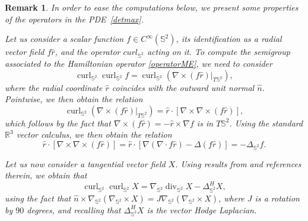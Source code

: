 \documentclass[11pt]{amsart}
\newtheorem{remark}[theorem]{Remark}
\newcommand{\R}{{\mathbb R}}
\newcommand{\IS}{\mathbb{S}}
\newcommand{\Deltalb}{\Delta_{\IS^2}}
\begin{document}
\begin{remark}\label{rmk:surf_op}
	In order to ease the computations below, we present some properties of the operators in the PDE~\eqref{detmax}.
	
	Let us consider a scalar function $f \in C^\infty(\mathbb S^2)$, its identification as a radial vector field $f\hat{r}$, and the operator $curl_{\IS^2}$ acting on it.
	To compute the semigroup associated to the Hamiltonian operator \eqref{operatorME}, we need to consider
	\[
	\operatorname{curl}_{\mathbb S^2} \operatorname{curl}_{\mathbb S^2} f
	=\operatorname{curl}_{\mathbb S^2} \left(\nabla\times (f\hat{r})|_{T\IS^2}\right),
	\]
	where the radial coordinate $\hat r$ coincides with the outward unit normal $\hat n$.
    Pointwise, we then obtain the relation
	\[
	\operatorname{curl}_{\mathbb S^2} \left(\nabla\times (f\hat{r})|_{T\IS^2}\right)= \hat r\cdot\left[\nabla\times \nabla\times (f\hat r)\right],
	\]
    which follows by the fact that $\nabla \times (f \hat{r}) = -\hat{r}\times \nabla f$ is in $T {\IS^{2}}$.
	Using the standard $\R^3$ vector calculus, we then obtain the relation
	\[
	\hat r\cdot\left[\nabla\times \nabla\times (f\hat r)\right]=\hat r\cdot\left[\nabla(\nabla\cdot f\hat r)-\Delta(f\hat r)\right]=-\Deltalb f.
	\]

	Let us now consider a tangential vector field $X$. Using results from \cite{tangVecField} and references therein, we obtain that
	\[
	\operatorname{curl}_{\mathbb S^2} \operatorname{curl}_{\mathbb S^2} X
	=
	\nabla_{\IS^{2}}\operatorname{div}_{\IS^2} X-\Delta_{\IS^2}^{H} X,
	\]
	using the fact that $\hat n\times \nabla_{\IS^{2}}(\nabla_{\IS^2}\times X)=J\nabla_{\IS^{2}}(\nabla_{\IS^2}\times X)$, where $J$ is a rotation by $90$ degrees, and recalling that $\Delta_{\IS^2}^{H} X$ is the vector Hodge Laplacian. 
\end{remark}
\end{document}
